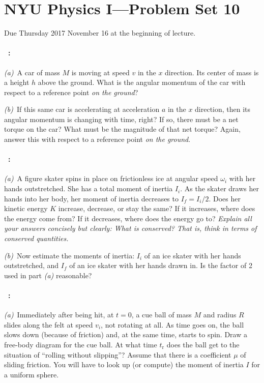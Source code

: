 \documentclass[12pt]{article}
\begin{document}
\section*{NYU Physics I---Problem Set 10}

Due Thursday 2017 November 16 at the beginning of lecture.

\paragraph{\problemname~\theproblem:}%
\textsl{(a)}~A car of mass $M$ is moving at speed $v$ in the $x$
direction. Its center of mass is a height $h$ above the ground.  What
is the angular momentum of the car with respect to a reference point
\emph{on the ground}?

\textsl{(b)}~If this same car is accelerating at acceleration $a$
in the $x$ direction, then its angular momentum is changing with time,
right? If so, there must be a net torque on the car? What must be
the magnitude of that net torque? Again, answer this with respect
to a reference point \emph{on the ground}.

\paragraph{\problemname~\theproblem:}%
\textsl{(a)}~A figure skater spins in place on frictionless ice at
angular speed $\omega_i$ with her hands outstretched.  She has a total
moment of inertia $I_i$.  As the skater draws her hands into her body,
her moment of inertia decreases to $I_f=I_i/2$.  Does her kinetic
energy $K$ increase, decrease, or stay the same?  If it increases,
where does the energy come from?  If it decreases, where does the
energy go to?  \emph{Explain all your answers concisely but clearly:
What is conserved? That is, think in terms of conserved quantities.}

\textsl{(b)}~Now estimate the moments of inertia: $I_i$ of an ice
skater with her hands outstretched, and $I_f$ of an ice skater with
her hands drawn in.  Is the factor of 2 used in part \textsl{(a)}
reasonable?

\paragraph{\problemname~\theproblem:}\label{cue}%
\textsl{(a)}~Immediately after being hit, at $t=0$, a cue ball of mass
$M$ and radius $R$ slides along the felt at speed $v_i$, not rotating
at all.  As time goes on, the ball slows down (because of friction)
and, at the same time, starts to spin.  Draw a free-body diagram for
the cue ball.  At what time $t_\mathrm{r}$ does the ball get to the
situation of ``rolling without slipping''?  Assume that there is a
coefficient $\mu$ of sliding friction. You will have to look up (or
compute) the moment of inertia $I$ for a uniform sphere.
\end{document}
